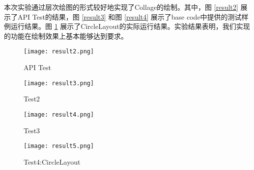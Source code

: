 
\acknowledgement
{}

本次实验通过层次绘图的形式较好地实现了Collage的绘制。其中，图 \ref{result2} 展示了API Test的结果，图 \ref{result3} 和图 \ref{result4} 展示了base code中提供的测试样例运行结果。图 \ref{result5} 展示了CircleLayout的实际运行结果。实验结果表明，我们实现的功能在绘制效果上基本能够达到要求。

\begin{figure}[htbp]
\centering
\begin{minipage}[t]{0.48\textwidth}
\centering
\texttt{[image: result2.png]}
\caption{API Test}
\label{result2}
\end{minipage}
\begin{minipage}[t]{0.48\textwidth}
\centering
\texttt{[image: result3.png]}
\caption{Test2}
\label{result3}
\end{minipage}
\centering
\begin{minipage}[t]{0.48\textwidth}
\centering
\texttt{[image: result4.png]}
\caption{Test3}
\label{result4}
\end{minipage}
\begin{minipage}[t]{0.48\textwidth}
\centering
\texttt{[image: result5.png]}
\caption{Test4:CircleLayout}
\label{result5}
\end{minipage}
\end{figure}















